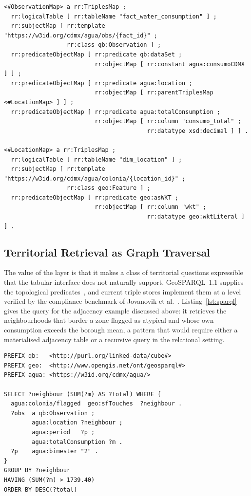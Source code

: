 \documentclass[runningheads]{llncs}
\renewcommand{\_}{\origunderscore\allowbreak}
\newif\ifshowchanges
\newenvironment{chgblock}{\ifshowchanges\color{chg}\fi}{}
\begin{document}
\begin{chgblock}
\begin{lstlisting}[caption={Excerpt of the R2RML triples map for the fact table.},label={lst:r2rml}]
<#ObservationMap> a rr:TriplesMap ;
  rr:logicalTable [ rr:tableName "fact_water_consumption" ] ;
  rr:subjectMap [ rr:template "https://w3id.org/cdmx/agua/obs/{fact_id}" ;
                  rr:class qb:Observation ] ;
  rr:predicateObjectMap [ rr:predicate qb:dataSet ;
                          rr:objectMap [ rr:constant agua:consumoCDMX ] ] ;
  rr:predicateObjectMap [ rr:predicate agua:location ;
                          rr:objectMap [ rr:parentTriplesMap <#LocationMap> ] ] ;
  rr:predicateObjectMap [ rr:predicate agua:totalConsumption ;
                          rr:objectMap [ rr:column "consumo_total" ;
                                         rr:datatype xsd:decimal ] ] .

<#LocationMap> a rr:TriplesMap ;
  rr:logicalTable [ rr:tableName "dim_location" ] ;
  rr:subjectMap [ rr:template "https://w3id.org/cdmx/agua/colonia/{location_id}" ;
                  rr:class geo:Feature ] ;
  rr:predicateObjectMap [ rr:predicate geo:asWKT ;
                          rr:objectMap [ rr:column "wkt" ;
                                         rr:datatype geo:wktLiteral ] ] .
\end{lstlisting}

\subsection{Territorial Retrieval as Graph Traversal}
\label{sec:sparql}

The value of the layer is that it makes a class of territorial questions
expressible that the tabular interface does not naturally support. GeoSPARQL~1.1
supplies the topological predicates~\cite{geosparql11,carhomburg2022}, and
current triple stores implement them at a level verified by the compliance
benchmark of Jovanovik et al.~\cite{jovanovik2021}. Listing~\ref{lst:sparql}
gives the query for the adjacency example discussed above: it retrieves the
neighbourhoods that border a zone flagged as atypical and whose own consumption
exceeds the borough mean, a pattern that would require either a materialised
adjacency table or a recursive query in the relational setting.

\begin{lstlisting}[caption={SPARQL query combining the statistical cube with the GeoSPARQL topology.},label={lst:sparql}]
PREFIX qb:   <http://purl.org/linked-data/cube#>
PREFIX geo:  <http://www.opengis.net/ont/geosparql#>
PREFIX agua: <https://w3id.org/cdmx/agua/>

SELECT ?neighbour (SUM(?m) AS ?total) WHERE {
  agua:colonia/flagged  geo:sfTouches  ?neighbour .
  ?obs  a qb:Observation ;
        agua:location ?neighbour ;
        agua:period   ?p ;
        agua:totalConsumption ?m .
  ?p    agua:bimester "2" .
}
GROUP BY ?neighbour
HAVING (SUM(?m) > 1739.40)
ORDER BY DESC(?total)
\end{lstlisting}


\end{chgblock}
\end{document}

